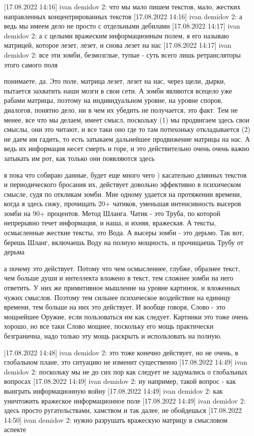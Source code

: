 [17.08.2022 14:16] ivan demidov 2: что мы мало пишем текстов, мало, жестких направленных концентрированных текстов
[17.08.2022 14:16] ivan demidov 2: а ведь мы имеем дело не просто с отдельными дебилами
[17.08.2022 14:17] ivan demidov 2: а с целыми вражеским информационным полем, я его называю матрицей, которое лезет, лезет, и снова лезет на нас
[17.08.2022 14:17] ivan demidov 2: все эти зомби, безмозглые, тупые - суть всего лишь ретрансляторы этого самого поля

понимаете, да. Это поле, матрица лезет, лезет на нас, через щели, дырки,
пытается захватить наши мозги в свои сети. А зомби являются всецело уже рабами
матрицы, поэтому на индивидуальном уровне, на уровне споров, диалогов, понятно
дело, ни в чем их убедить не получается, это факт. Тем не менее, все что мы
делаем, имеет смысл, поскольку (1) мы продвигаем здесь свои смыслы, они это
читают, и все таки оно где то там потихоньку откладывается (2) не даем им
гадить, то есть затыкаем дальнейшее продвижение матрицы на нас. А ведь их
информация несет смерть и горе, и это действительно очень очень важно затыкать
им рот, как только они появляются здесь

я пока что собираю данные, будет еще много чего ) касательно длинных текстов и
периодического бросания их, действует довольно эффективно в психическом смысле,
судя по откликам зомби. Мне одному удается на протяжении времени, когда я здесь
сижу, прочищать 20+ чатиков, уменьшая интенсивность высеров зомби на 90+
процентов. Метод Шланга. Чатик - это Труба, по которой непрерывно течет
информация, и наша, и ихняя, вражеская. А тексты, осмысленные жесткие тексты,
это Вода. А высеры зомби - это дерьмо. Так вот, берешь Шланг, включаешь Воду на
полную мощность, и прочищаешь Трубу от дерьма

а почему это действует. Потому что чем осмысленнее, глубже, образнее текст, чем
больше души и интеллекта вложено в текст, тем сложнее зомби на него ответить. У
них же примитивное мышление на уровне картинок, и вложенных чужих смыслов.
Поэтому тем сильнее психическое воздействие на единицу времени, тем больше на
них это действует. И вообще говоря, Слово - это мощнейшее Оружие, если
пользоваться им как следует. Картинки это тоже очень хорошо, но все таки Слово
мощнее, поскольку его мощь практически безгранична, надо только эту мощь
раскрыть и использовать на полную.

[17.08.2022 14:48] ivan demidov 2: это тоже конечно действует, но не очень, в глобальном плане, это ситуацию не изменит существенно
[17.08.2022 14:49] ivan demidov 2: поскольку мы не до сих пор как следует не задумались о глобальных вопросах
[17.08.2022 14:49] ivan demidov 2: ну например, такой вопрос - как выиграть информационную войну
[17.08.2022 14:49] ivan demidov 2: как уничтожить вражеское информационное поле
[17.08.2022 14:49] ivan demidov 2: здесь просто ругательствами, хамством и так далее, не обойдешься
[17.08.2022 14:50] ivan demidov 2: нужно разрушать вражескую матрицу в смысловом аспекте

